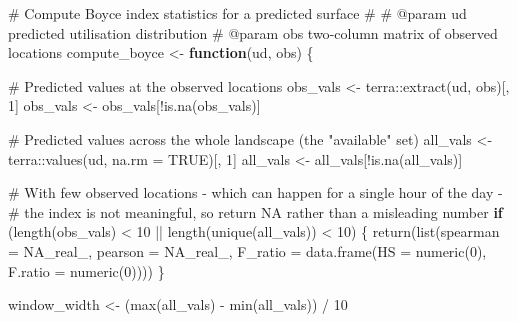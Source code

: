 \documentclass[
  letterpaper,
  DIV=11,
  numbers=noendperiod]{scrartcl}
\newenvironment{Shaded}{\begin{snugshade}}{\end{snugshade}}
\newcommand{\AttributeTok}[1]{\textcolor[rgb]{0.40,0.45,0.13}{#1}}
\newcommand{\CommentTok}[1]{\textcolor[rgb]{0.37,0.37,0.37}{#1}}
\newcommand{\ConstantTok}[1]{\textcolor[rgb]{0.56,0.35,0.01}{#1}}
\newcommand{\ControlFlowTok}[1]{\textcolor[rgb]{0.00,0.23,0.31}{\textbf{#1}}}
\newcommand{\DecValTok}[1]{\textcolor[rgb]{0.68,0.00,0.00}{#1}}
\newcommand{\FunctionTok}[1]{\textcolor[rgb]{0.28,0.35,0.67}{#1}}
\newcommand{\NormalTok}[1]{\textcolor[rgb]{0.00,0.23,0.31}{#1}}
\newcommand{\OtherTok}[1]{\textcolor[rgb]{0.00,0.23,0.31}{#1}}
\newcommand{\SpecialCharTok}[1]{\textcolor[rgb]{0.37,0.37,0.37}{#1}}
\begin{document}
\begin{Shaded}
\begin{Highlighting}[]
\CommentTok{\#\textquotesingle{} Compute Boyce index statistics for a predicted surface}
\CommentTok{\#\textquotesingle{}}
\CommentTok{\#\textquotesingle{} @param ud  predicted utilisation distribution}
\CommentTok{\#\textquotesingle{} @param obs two{-}column matrix of observed locations}
\NormalTok{compute\_boyce }\OtherTok{\textless{}{-}} \ControlFlowTok{function}\NormalTok{(ud, obs) \{}

  \CommentTok{\# Predicted values at the observed locations}
\NormalTok{  obs\_vals }\OtherTok{\textless{}{-}}\NormalTok{ terra}\SpecialCharTok{::}\FunctionTok{extract}\NormalTok{(ud, obs)[, }\DecValTok{1}\NormalTok{]}
\NormalTok{  obs\_vals }\OtherTok{\textless{}{-}}\NormalTok{ obs\_vals[}\SpecialCharTok{!}\FunctionTok{is.na}\NormalTok{(obs\_vals)]}

  \CommentTok{\# Predicted values across the whole landscape (the "available" set)}
\NormalTok{  all\_vals }\OtherTok{\textless{}{-}}\NormalTok{ terra}\SpecialCharTok{::}\FunctionTok{values}\NormalTok{(ud, }\AttributeTok{na.rm =} \ConstantTok{TRUE}\NormalTok{)[, }\DecValTok{1}\NormalTok{]}
\NormalTok{  all\_vals }\OtherTok{\textless{}{-}}\NormalTok{ all\_vals[}\SpecialCharTok{!}\FunctionTok{is.na}\NormalTok{(all\_vals)]}

  \CommentTok{\# With few observed locations {-} which can happen for a single hour of the day {-}}
  \CommentTok{\# the index is not meaningful, so return NA rather than a misleading number}
  \ControlFlowTok{if}\NormalTok{ (}\FunctionTok{length}\NormalTok{(obs\_vals) }\SpecialCharTok{\textless{}} \DecValTok{10} \SpecialCharTok{||} \FunctionTok{length}\NormalTok{(}\FunctionTok{unique}\NormalTok{(all\_vals)) }\SpecialCharTok{\textless{}} \DecValTok{10}\NormalTok{) \{}
    \FunctionTok{return}\NormalTok{(}\FunctionTok{list}\NormalTok{(}\AttributeTok{spearman =} \ConstantTok{NA\_real\_}\NormalTok{, }\AttributeTok{pearson =} \ConstantTok{NA\_real\_}\NormalTok{,}
                \AttributeTok{F\_ratio =} \FunctionTok{data.frame}\NormalTok{(}\AttributeTok{HS =} \FunctionTok{numeric}\NormalTok{(}\DecValTok{0}\NormalTok{), }\AttributeTok{F.ratio =} \FunctionTok{numeric}\NormalTok{(}\DecValTok{0}\NormalTok{))))}
\NormalTok{  \}}

\NormalTok{  window\_width }\OtherTok{\textless{}{-}}\NormalTok{ (}\FunctionTok{max}\NormalTok{(all\_vals) }\SpecialCharTok{{-}} \FunctionTok{min}\NormalTok{(all\_vals)) }\SpecialCharTok{/} \DecValTok{10}


\end{Highlighting}
\end{Shaded}
\end{document}
